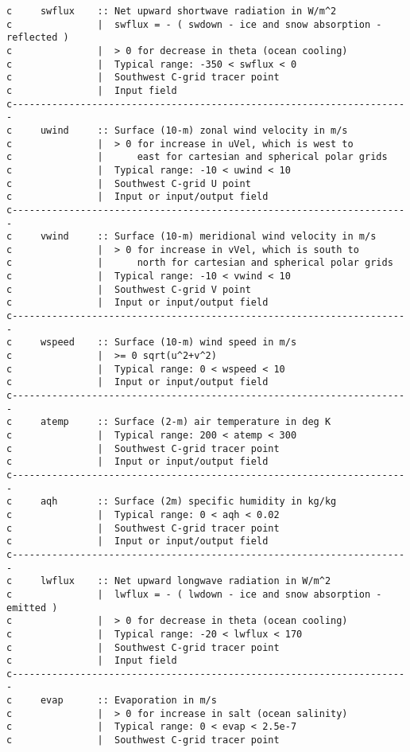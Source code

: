 {\begin{verbatim}
c     swflux    :: Net upward shortwave radiation in W/m^2
c               |  swflux = - ( swdown - ice and snow absorption - reflected )
c               |  > 0 for decrease in theta (ocean cooling)
c               |  Typical range: -350 < swflux < 0
c               |  Southwest C-grid tracer point
c               |  Input field
c----------------------------------------------------------------------
c     uwind     :: Surface (10-m) zonal wind velocity in m/s
c               |  > 0 for increase in uVel, which is west to
c               |      east for cartesian and spherical polar grids
c               |  Typical range: -10 < uwind < 10
c               |  Southwest C-grid U point
c               |  Input or input/output field
c----------------------------------------------------------------------
c     vwind     :: Surface (10-m) meridional wind velocity in m/s
c               |  > 0 for increase in vVel, which is south to
c               |      north for cartesian and spherical polar grids
c               |  Typical range: -10 < vwind < 10
c               |  Southwest C-grid V point
c               |  Input or input/output field
c----------------------------------------------------------------------
c     wspeed    :: Surface (10-m) wind speed in m/s
c               |  >= 0 sqrt(u^2+v^2)
c               |  Typical range: 0 < wspeed < 10
c               |  Input or input/output field
c----------------------------------------------------------------------
c     atemp     :: Surface (2-m) air temperature in deg K
c               |  Typical range: 200 < atemp < 300
c               |  Southwest C-grid tracer point
c               |  Input or input/output field
c----------------------------------------------------------------------
c     aqh       :: Surface (2m) specific humidity in kg/kg
c               |  Typical range: 0 < aqh < 0.02
c               |  Southwest C-grid tracer point
c               |  Input or input/output field
c----------------------------------------------------------------------
c     lwflux    :: Net upward longwave radiation in W/m^2
c               |  lwflux = - ( lwdown - ice and snow absorption - emitted )
c               |  > 0 for decrease in theta (ocean cooling)
c               |  Typical range: -20 < lwflux < 170
c               |  Southwest C-grid tracer point
c               |  Input field
c----------------------------------------------------------------------
c     evap      :: Evaporation in m/s
c               |  > 0 for increase in salt (ocean salinity)
c               |  Typical range: 0 < evap < 2.5e-7
c               |  Southwest C-grid tracer point

\end{verbatim}}
